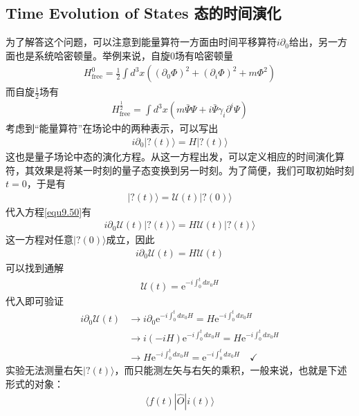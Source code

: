 \subsection{Time Evolution of States 态的时间演化}\label{sec9.5.2}
为了解答这个问题，可以注意到能量算符一方面由时间平移算符$i\partial_0$给出，另一方面也是系统哈密顿量。举例来说，自旋$0$场有哈密顿量
\begin{align}\label{equ9.48}
H_\text{free}^0=\frac{1}{2}\int d^3x\left( (\partial_0\Phi)^2+(\partial_i\Phi)^2+m\Phi^2\right)
\end{align}
而自旋$\frac{1}{2}$场有
\begin{align}\label{equ9.49}
H_\text{free}^{\frac{1}{2}}=\int d^3x(m\bar{\Psi}\Psi+i\bar{\Psi}\gamma_i\partial^i\Psi)
\end{align}
考虑到“能量算符”在场论中的两种表示，可以写出
\begin{align}\label{equ9.50}
i\partial_0|?(t)\rangle=H|?(t)\rangle
\end{align}
这也是量子场论中态的演化方程。从这一方程出发，可以定义相应的时间演化算符，其效果是将某一时刻的量子态变换到另一时刻。为了简便，我们可取初始时刻$t=0$，于是有
\begin{align}\label{equ9.51}
|?(t)\rangle=\mathcal{U}(t)|?(0)\rangle
\end{align}
代入方程\ref{equ9.50}有
\begin{align}\label{equ9.52}
i\partial_0\mathcal{U}(t)|?(t)\rangle=H\mathcal{U}(t)|?(t)\rangle
\end{align}
这一方程对任意$|?(0)\rangle$成立，因此
\begin{align}\label{equ9.53}
i\partial_0\mathcal{U}(t)=H\mathcal{U}(t)
\end{align}
可以找到通解
\begin{align}\label{equ9.54}
\mathcal{U}(t)=\text{e}^{-i\int_0^tdx_0H}
\end{align}
代入即可验证
\begin{align}\label{equ9.55}
i\partial_0\mathcal{U}(t)&\to i\partial_0\text{e}^{-i\int_0^tdx_0H}=H\text{e}^{-i\int_0^t dx_0H}\nonumber\\
&\to i(-iH)\text{e}^{-i\int_0^tdx_0H}=H\text{e}^{-i\int_0^tdx_0H}\nonumber\\
&\to H\text{e}^{-i\int_0^tdx_0H}=\text{e}^{-i\int_0^tdx_0H}\quad\checkmark
\end{align}
实验无法测量右矢$|?(t)\rangle$，而只能测左矢与右矢的乘积，一般来说，也就是下述形式的对象：
\begin{align}\label{equ9.56}
\langle f(t)|\hat{O}|i(t)\rangle
\end{align}
